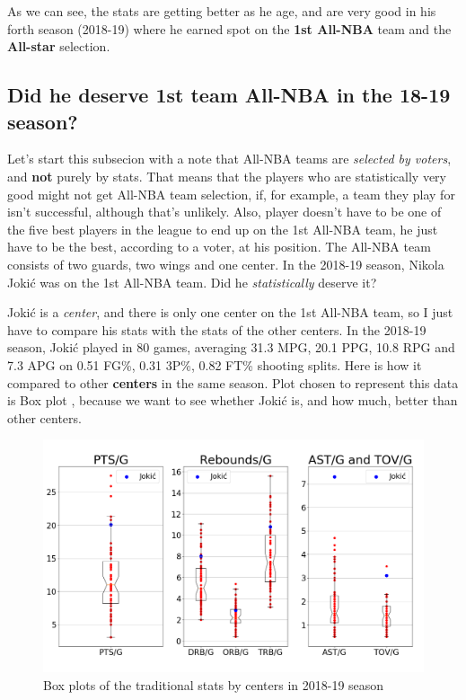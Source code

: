 \documentclass[a4paper]{article}
\begin{document}
As we can see, the stats are getting better as he age, and are very good in his forth season (2018-19) where he earned spot on the \textbf{1st All-NBA} team and the \textbf{All-star} selection.

\subsection{Did he deserve 1st team All-NBA in the 18-19 season?}
\label{subsec:jokic_all_nba}

Let's start this subsecion with a note that All-NBA teams are \textit{selected by voters}, and \textbf{not} purely by stats. That means that the players who are statistically very good might not get All-NBA team selection, if, for example, a team they play for isn't successful, although that's unlikely. Also, player doesn't have to be one of the five best players in the league to end up on the 1st All-NBA team, he just have to be the best, according to a voter, at his position. The All-NBA team consists of two guards, two wings and one center. In the 2018-19 season, Nikola Joki\' c was on the 1st All-NBA team. Did he \textit{statistically} deserve it?

Joki\' c is a \textit{center}, and there is only one center on the 1st All-NBA team, so I just have to compare his stats with the stats of the other centers. In the 2018-19 season, Joki\' c played in 80 games, averaging 31.3 MPG, 20.1 PPG, 10.8 RPG and 7.3 APG on 0.51 FG\%, 0.31 3P\%, 0.82 FT\% shooting splits. Here is how it compared to other \textbf{centers} in the same season. Plot chosen to represent this data is Box plot \cite{boxplots}, because we want to see whether Joki\' c is, and how much, better than other centers.


\begin{figure}[h!]
\begin{center}
\includegraphics[scale=0.30]{centers_traditional.png}
\end{center}
\caption{Box plots of the traditional stats by centers in 2018-19 season}
\label{plt:centers_trad}
\end{figure}
\end{document}
